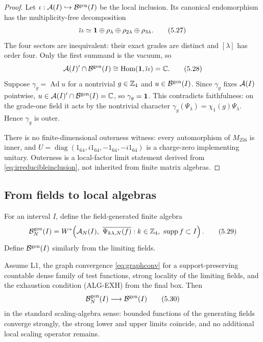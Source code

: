 \begin{proof}
Let $\iota:\mathcal A(I)\hookrightarrow\mathcal B^{\rm gen}(I)$ be the local inclusion.
Its canonical endomorphism has the multiplicity-free decomposition
\[
 \overline\iota\iota
 \simeq\mathbf 1\oplus\rho_\lambda\oplus\rho_{2\lambda}
              \oplus\rho_{3\lambda}.
\tag{5.27}\label{eq:canonicalendo}
\]
The four sectors are inequivalent: their exact grades are distinct and
$[\lambda]$ has order four.  Only the first summand is the vacuum, so
\[
 \mathcal A(I)'\cap\mathcal B^{\rm gen}(I)
 \cong\operatorname{Hom}(\mathbf 1,\overline\iota\iota)=\mathbb C.
\tag{5.28}\label{eq:irreducibleinclusion}
\]
Suppose $\gamma_g=\operatorname{Ad}u$ for a nontrivial $g\in\mathbb Z_4$ and
$u\in\mathcal B^{\rm gen}(I)$.  Since $\gamma_g$ fixes $\mathcal A(I)$ pointwise,
$u\in\mathcal A(I)'\cap\mathcal B^{\rm gen}(I)=\mathbb C$, so $\gamma_g=\mathbf 1$.  This contradicts
faithfulness: on the grade-one field it acts by the nontrivial character
$\gamma_g(\Psi_\lambda)=\chi_1(g)\Psi_\lambda$.  Hence $\gamma_g$ is
outer.

There is no finite-dimensional outerness witness: every automorphism of
$M_{256}$ is inner, and
$U=\operatorname{diag}(1_{64},i1_{64},-1_{64},-i1_{64})$ is a
charge-zero implementing unitary.  Outerness is a local-factor limit
statement derived from \eqref{eq:irreducibleinclusion}, not inherited
from finite matrix algebras.
\end{proof}

\subsection{From fields to local algebras}

For an interval $I$, define the field-generated finite algebra
\[
 \mathcal B_N^{\rm gen}(I)
 =W^*\!\left(
 \mathcal A_N(I),\
 \overline{\Psi_{k\lambda,N}(f)}:
 k\in\mathbb Z_4,\ \operatorname{supp} f\subset I
 \right).
\tag{5.29}\label{eq:generatedfinite}
\]
Define $\mathcal B^{\rm gen}(I)$ similarly from the limiting fields.

\begin{lemma}
\label{lem:algconv}
Assume L1, the graph convergence \eqref{eq:graphconv} for a
support-preserving countable dense family of test functions, strong
locality of the limiting fields, and the exhaustion condition
\textup{(ALG-EXH)} from the final box.  Then
\[
 \mathcal B_N^{\rm gen}(I)\longrightarrow\mathcal B^{\rm gen}(I)
\tag{5.30}\label{eq:algconv}
\]
in the standard scaling-algebra sense: bounded functions of the
generating fields converge strongly, the strong lower and upper limits
coincide, and no additional local scaling operator remains.
\end{lemma}

